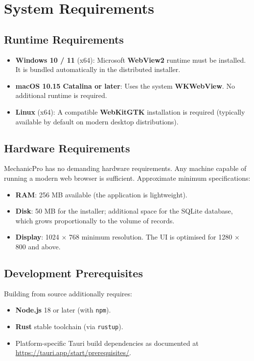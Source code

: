 \documentclass[12pt, a4paper]{report}
\newcommand{\term}[1]{\textbf{\color{Blue}#1}}
\begin{document}
	\section{System Requirements}

	\subsection*{Runtime Requirements}
	\begin{itemize}
		\item \textbf{Windows 10 / 11} (x64): Microsoft \term{WebView2} runtime must
		      be installed. It is bundled automatically in the distributed installer.
		\item \textbf{macOS 10.15 Catalina or later}: Uses the system \term{WKWebView}.
		      No additional runtime is required.
		\item \textbf{Linux} (x64): A compatible \term{WebKitGTK} installation is
		      required (typically available by default on modern desktop distributions).
	\end{itemize}

	\subsection*{Hardware Requirements}
	MechanicPro has no demanding hardware requirements. Any machine capable of running
	a modern web browser is sufficient. Approximate minimum specifications:

	\begin{itemize}
		\item \textbf{RAM}: 256 MB available (the application is lightweight).
		\item \textbf{Disk}: 50 MB for the installer; additional space for the SQLite
		      database, which grows proportionally to the volume of records.
		\item \textbf{Display}: 1024 × 768 minimum resolution. The UI is optimised
		      for 1280 × 800 and above.
	\end{itemize}

	\subsection*{Development Prerequisites}
	Building from source additionally requires:
	\begin{itemize}
		\item \textbf{Node.js} 18 or later (with \texttt{npm}).
		\item \textbf{Rust} stable toolchain (via \texttt{rustup}).
		\item Platform-specific Tauri build dependencies as documented at
		      \url{https://tauri.app/start/prerequisites/}.
	\end{itemize}
\end{document}
